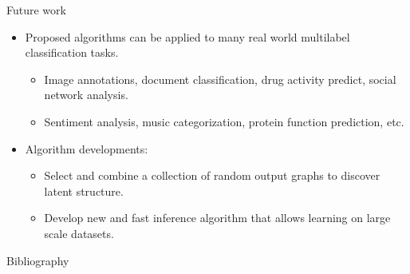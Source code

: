 \documentclass[first=purple,second=dgreen,logo=redexc]{aaltoslides}
\begin{document}
{\begin{frame}{Future work}
	\begin{itemize}
		\item Proposed algorithms can be applied to many real world multilabel classification tasks.
		\begin{itemize}
			\footnotesize
			\item Image annotations, document classification, drug activity predict, social network analysis.
			\item Sentiment analysis, music categorization, protein function prediction, etc.
		\end{itemize}
		\item Algorithm developments:
		\begin{itemize}
			\footnotesize
			\item Select and combine a collection of random output graphs to discover latent structure.
			\item Develop new and fast inference algorithm that allows learning on large scale datasets.
		\end{itemize}
	\end{itemize}
\end{frame}

\begin{frame}[allowframebreaks]{Bibliography}
%

 
\end{frame}

}
\end{document}
